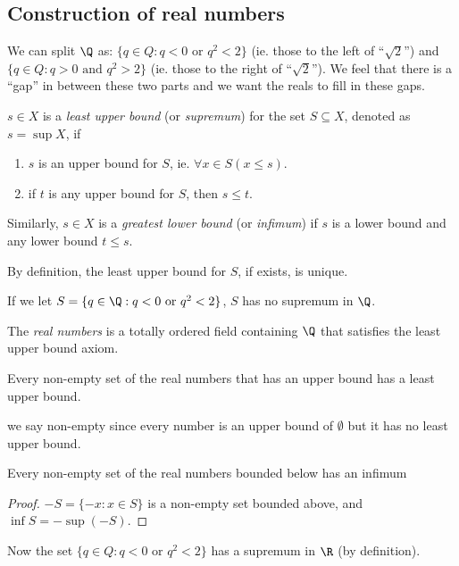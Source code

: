 \documentclass[a4paper]{article}
\begin{document}
  \subsection{Construction of real numbers}
  We can split $\Q$ as: $\{q\in Q: q < 0 \text{ or } q^2 < 2\}$ (ie. those to the left of ``$\sqrt{2}$'') and $\{q\in Q: q > 0 \text{ and } q^2 > 2\}$ (ie. those to the right of ``$\sqrt{2}$''). We feel that there is a ``gap'' in between these two parts and we want the reals to fill in these gaps. 

  \begin{defi}
    $s\in X$ is a \emph{least upper bound} (or \emph{supremum}) for the set $S\subseteq X$, denoted as $s = \sup X$, if
    \begin{enumerate}
      \item $s$ is an upper bound for $S$, ie. $\forall x\in S(x \leq s)$.
      \item if $t$ is any upper bound for $S$, then $s \leq t$.
    \end{enumerate}

    Similarly, $s\in X$ is a \emph{greatest lower bound} (or \emph{infimum}) if $s$ is a lower bound and any lower bound $t \leq s$. 
  \end{defi}
  By definition, the least upper bound for $S$, if exists, is unique.

  If we let $S = \{q\in \Q: q < 0 \text{ or } q^2 < 2\}$, $S$ has no supremum in $\Q$.
  \begin{defi}
    The \emph{real numbers} is a totally ordered field containing $\Q$ that satisfies the least upper bound axiom.
  \end{defi}

  \begin{axiom}
    Every non-empty set of the real numbers that has an upper bound has a least upper bound.
  \end{axiom}

  \note we say non-empty since every number is an upper bound of $\emptyset$ but it has no least upper bound.

  \begin{cor}
    Every non-empty set of the real numbers bounded below has an infimum
  \end{cor}
  \begin{proof}
    $-S = \{-x: x\in S\}$  is a non-empty set bounded above, and $\inf S = -\sup (-S)$.
  \end{proof}
  Now the set $\{q\in Q: q < 0 \text{ or } q^2 < 2\}$ has a supremum in $\R$ (by definition).
\end{document}
